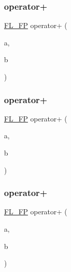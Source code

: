\mbox{\label{class_f_l___f_p_a96dfe1fef405deebcdd77739a80baf4e}} 
\subsubsection{\texorpdfstring{operator+}{operator+}\hspace{0.1cm}{\footnotesize\ttfamily [1/3]}}
{\footnotesize\ttfamily \hyperlink{class_f_l___f_p}{F\+L\+\_\+\+FP} operator+ (\begin{DoxyParamCaption}\item[{const \hyperlink{class_f_l___f_p}{F\+L\+\_\+\+FP} \&}]{a,  }\item[{const \hyperlink{class_f_l___f_p}{F\+L\+\_\+\+FP} \&}]{b }\end{DoxyParamCaption})\hspace{0.3cm}{\ttfamily [friend]}}

\mbox{\label{class_f_l___f_p_a230919bb5d28822bd782aa7ca3465eba}} 
\subsubsection{\texorpdfstring{operator+}{operator+}\hspace{0.1cm}{\footnotesize\ttfamily [2/3]}}
{\footnotesize\ttfamily \hyperlink{class_f_l___f_p}{F\+L\+\_\+\+FP} operator+ (\begin{DoxyParamCaption}\item[{const \hyperlink{class_f_l___f_p}{F\+L\+\_\+\+FP} \&}]{a,  }\item[{const double \&}]{b }\end{DoxyParamCaption})\hspace{0.3cm}{\ttfamily [friend]}}

\mbox{\label{class_f_l___f_p_a4934b87fe91ceefeb77cc0fbf926329c}} 
\subsubsection{\texorpdfstring{operator+}{operator+}\hspace{0.1cm}{\footnotesize\ttfamily [3/3]}}
{\footnotesize\ttfamily \hyperlink{class_f_l___f_p}{F\+L\+\_\+\+FP} operator+ (\begin{DoxyParamCaption}\item[{const double \&}]{a,  }\item[{const \hyperlink{class_f_l___f_p}{F\+L\+\_\+\+FP} \&}]{b }\end{DoxyParamCaption})\hspace{0.3cm}{\ttfamily [friend]}}

